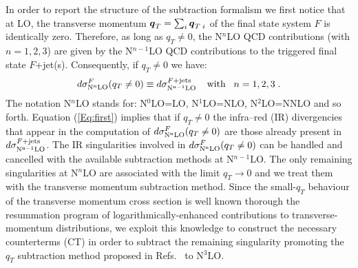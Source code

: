 \documentclass[12pt]{article}
\def\bom#1{{\mbox{\boldmath $#1$}}}
\def\qt{q_T}
\begin{document}
In order to report the structure  of the subtraction formalism we first notice that at LO, the transverse momentum $\bom{q}_{T}=\sum_i \bom{q}_{T\;i}$ of the final state system $F$ is identically zero. Therefore, as long as $\qt \neq 0$, the N$^{n}$LO QCD contributions (with $n=1,2,3$) are given by the N$^{n-1}$LO QCD contributions to the triggered final state $F$+jet(s). Consequently, if $\qt \neq 0$ we have:
\begin{equation}
\label{Eq:first}
d\sigma^{F}_{\rm N^{n}LO}(\qt \neq0) \equiv d\sigma^{F+{\rm jets}}_{\rm N^{n-1}LO}\;\;\;\;{\rm with}\;\;\; n=1,2,3\;.
\end{equation}
The notation N$^{n}$LO stands for: N$^{0}$LO=LO, N$^{1}$LO=NLO, N$^{2}$LO=NNLO and so forth. Equation (\ref{Eq:first})  implies that if $\qt \neq 0$ the infra--red (IR) divergencies that appear in the computation of $d\sigma^{F}_{\rm N^{n}LO}(\qt \neq0)$ are those already present in $d\sigma^{F+{\rm jets}}_{\rm N^{n-1}LO}$. %
The IR singularities involved in $d\sigma^{F}_{\rm N^{n}LO}(\qt \neq0)$ can be handled and cancelled with the available subtraction methods at N$^{n-1}$LO. The only remaining singularities at  N$^{n}$LO are associated with the limit $\qt \rightarrow 0$ and we treat them with the transverse momentum subtraction method. Since the small-$\qt$ behaviour of the transverse momentum cross section is well known thorough the resummation program \cite{qTRes:program} of logarithmically-enhanced contributions to transverse-momentum distributions, we exploit this knowledge to construct the necessary counterterms (CT) in order to subtract the remaining singularity promoting the $q_T$ subtraction method proposed in Refs.~\cite{Catani:2007vq,Bozzi:2005wk,Bozzi:2003jy} to N$^{3}$LO. 

\end{document}
